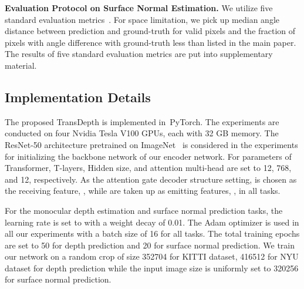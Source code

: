 \documentclass[10pt,twocolumn,letterpaper]{article}
\begin{document}
\par\noindent\textbf{Evaluation Protocol on Surface Normal Estimation.} We utilize five standard evaluation metrics~\cite{fouhey2013data}. For space limitation, we pick up median angle distance between prediction and ground-truth for valid pixels and the fraction of pixels with angle difference with ground-truth less than  listed in the main paper. The results of five standard evaluation metrics are put into supplementary material.

\subsection{Implementation Details} 
The proposed TransDepth is implemented in~PyTorch. The experiments are conducted on four Nvidia Tesla V100 GPUs, each with 32 GB memory. The ResNet-50 architecture pretrained on ImageNet~\cite{deng2009imagenet} is considered in the experiments for initializing the backbone network of our encoder network. For parameters of Transformer, T-layers, Hidden size, and attention multi-head are set to 12, 768, and 12, respectively.
As the attention gate decoder structure setting,  is chosen as the receiving feature, , while  are taken up as emitting features, , in all tasks.

For the monocular depth estimation and surface normal prediction tasks, the learning rate is set to  with a weight decay of 0.01. The Adam optimizer is used in all our experiments with a batch size of 16 for all tasks. 
The total training epochs are set to 50 for depth prediction and 20 for surface normal prediction. We train our network on a random crop of size 352704 for KITTI dataset, 416512 for NYU dataset for depth prediction while
the input image size is uniformly set to 320256 for surface normal prediction.
\end{document}
